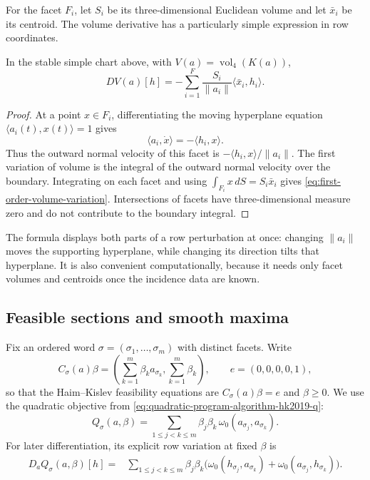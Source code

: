 For the facet \(F_i\), let \(S_i\) be its three-dimensional Euclidean volume
and let \(\bar x_i\) be its centroid.  The volume derivative has a particularly
simple expression in row coordinates.

\begin{proposition}
\label{prop:first-order-volume-variation}
In the stable simple chart above, with
\(V(a)=\operatorname{vol}_4(K(a))\),
\begin{equation}\label{eq:first-order-volume-variation}
  DV(a)[h]
  =-
  \sum_{i=1}^F
    \frac{S_i}{\lVert a_i\rVert}
    \langle \bar x_i,h_i\rangle.
\end{equation}
\end{proposition}

\begin{proof}
At a point \(x\in F_i\), differentiating the moving hyperplane equation
\(\langle a_i(t),x(t)\rangle=1\) gives
\[
  \langle a_i,\dot x\rangle=-\langle h_i,x\rangle.
\]
Thus the outward normal velocity of this facet is
\(-\langle h_i,x\rangle/\lVert a_i\rVert\).  The first variation of volume is
the integral of the outward normal velocity over the boundary.  Integrating on
each facet and using
\(\int_{F_i}x\,dS=S_i\bar x_i\) gives
\eqref{eq:first-order-volume-variation}.  Intersections of facets have
three-dimensional measure zero and do not contribute to the boundary
integral.
\end{proof}

The formula displays both parts of a row perturbation at once: changing
\(\lVert a_i\rVert\) moves the supporting hyperplane, while changing its
direction tilts that hyperplane.  It is also convenient computationally,
because it needs only facet volumes and centroids once the incidence data are
known.

\subsection{Feasible sections and smooth maxima}
\label{subsec:first-order-hk-branches}

Fix an ordered word
\(\sigma=(\sigma_1,\ldots,\sigma_m)\) with distinct facets.  Write
\[
  C_\sigma(a)\beta
  =
  \left(
    \sum_{k=1}^m\beta_k a_{\sigma_k},
    \sum_{k=1}^m\beta_k
  \right),
  \qquad e=(0,0,0,0,1),
\]
so that the Haim--Kislev feasibility equations are
\(C_\sigma(a)\beta=e\) and \(\beta\geq0\).  We use the quadratic objective
from \eqref{eq:quadratic-program-algorithm-hk2019-q}:
\begin{equation}\label{eq:first-order-fixed-word-q}
  Q_\sigma(a,\beta)
  =
  \sum_{1\leq j<k\leq m}
    \beta_j\beta_k\,
    \omega_0(a_{\sigma_j},a_{\sigma_k}).
\end{equation}
For later differentiation, its explicit row variation at fixed \(\beta\) is
\begin{equation}\label{eq:first-order-explicit-q-variation}
\begin{split}
  D_aQ_\sigma(a,\beta)[h]
  ={}&\sum_{1\leq j<k\leq m}\beta_j\beta_k
  \bigl(
    \omega_0(h_{\sigma_j},a_{\sigma_k})
    +\omega_0(a_{\sigma_j},h_{\sigma_k})
  \bigr).
\end{split}
\end{equation}

